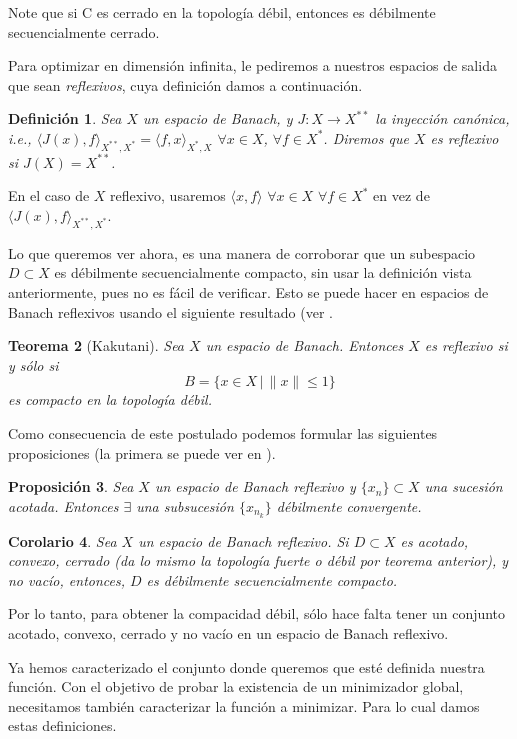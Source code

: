\documentclass[a4paper,10pt]{book}
\newcommand{\arr}{\rightarrow}
\newcommand{\la}{\langle}
\newcommand{\ra}{\rangle}
\newtheorem{teo}{Teorema}[section]
\newtheorem{cor}[teo]{Corolario}
\newtheorem{prop}[teo]{Proposici\'on}
\newtheorem{defi}[teo]{Definici\'on}
\begin{document}
Note que si C es cerrado en la topología débil, entonces es débilmente secuencialmente cerrado.

Para optimizar en dimensión infinita, le pediremos a nuestros espacios de salida que sean \emph{reflexivos}, cuya definición damos a continuación.

\begin{defi}
 Sea $X$ un espacio de Banach, y $J:X\arr X^{**}$ la inyección canónica, i.e., $\la J(x),f\ra_{X^{**},X^*}=\la f,x\ra_{X^*,X}$ $\forall x\in X$, $\forall f\in X^*$. Diremos que $X$ es reflexivo si $J(X)=X^{**}$.
\end{defi}

En el caso de $X$ reflexivo, usaremos $\la x,f\ra$ $\forall x\in X$ $\forall f\in X^*$ en vez de $\la J(x),f\ra_{X^{**},X^*}$.

Lo que queremos ver ahora, es una manera de corroborar que un subespacio $D\subset X$ es débilmente secuencialmente compacto, sin usar la definición vista anteriormente, pues no es fácil de verificar. Esto se puede hacer en espacios de Banach reflexivos usando el siguiente resultado (ver \cite[Theorem 3.17.]{brezis2010functional}.
\begin{teo}[Kakutani]\label{kakutani}
 Sea $X$ un espacio de Banach. Entonces $X$ es reflexivo si y sólo si
 \[
  B=\{x\in X\,|\,\|x\|\leq1\}
 \]
es compacto en la topología débil.
\end{teo}

Como consecuencia de este postulado podemos formular las siguientes proposiciones (la primera se puede ver en \cite[Theorem 3.18.]{brezis2010functional}).

\begin{prop}
Sea $X$ un espacio de Banach reflexivo y $\{x_n\}\subset X$ una sucesión acotada. Entonces $\exists$ una subsucesión $\{x_{n_k}\}$ débilmente convergente.
\end{prop}


\begin{cor}
Sea $X$ un espacio de Banach reflexivo. Si $D\subset X$ es acotado, convexo, cerrado (da lo mismo la topología fuerte o débil por teorema anterior), y no vacío, entonces, $D$ es débilmente secuencialmente compacto.
\end{cor}

Por lo tanto, para obtener la compacidad débil, sólo hace falta tener un conjunto acotado, convexo, cerrado y no vacío en un espacio de Banach reflexivo.

Ya hemos caracterizado el conjunto donde queremos que esté definida nuestra función. Con el objetivo de probar la existencia de un minimizador global, necesitamos también caracterizar la función a minimizar. Para lo cual damos estas definiciones.
\end{document}
